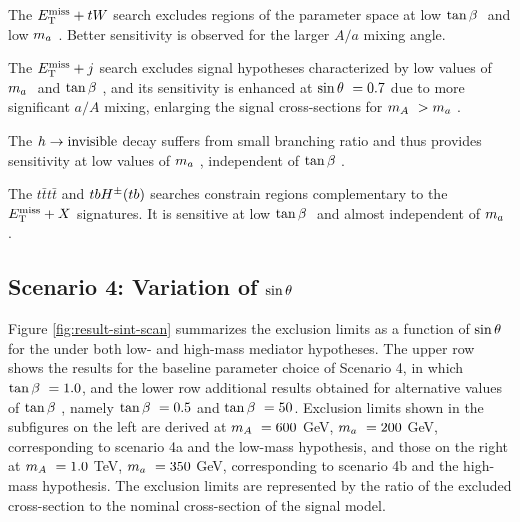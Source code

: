 The $E_{\mathrm{T}}^{\mathrm{miss}}+tW$ search excludes regions of the parameter space at low $\tan\beta~$ and low $m_a~$. Better sensitivity is observed for the larger $A/a$ mixing angle. 

The $E_{\mathrm{T}}^{\mathrm{miss}}+j$ search excludes signal hypotheses characterized by low values of $m_a~$ and $\tan\beta~$, and its sensitivity is enhanced at $\sin\theta~=0.7$ due to more significant $a/A$ mixing, enlarging the signal cross-sections for $m_A~>m_a~$. 

The $h\rightarrow \mathrm{invisible}$ decay suffers from small branching ratio and thus provides sensitivity at low values of $m_a~$, independent of $\tan\beta~$.

The $t\bar{t}t\bar{t}$ and $tbH^{\pm}(tb)$ searches constrain regions complementary to the $E_{\mathrm{T}}^{\mathrm{miss}}+X$ signatures. It is sensitive at low $\tan\beta~$ and almost independent of $m_a~$.

\subsection{Scenario 4: Variation of \texorpdfstring{$\sin\theta~$}{TEXT}}

Figure \ref{fig:result-sint-scan} summarizes the exclusion limits as a function of $\sin\theta~$ for the \thdma under both low- and high-mass mediator hypotheses. The upper row shows the results for the baseline parameter choice of Scenario 4, in which $\tan\beta~=1.0$, and the lower row additional results obtained for alternative values of $\tan\beta~$, namely $\tan\beta~=0.5$ and $\tan\beta~=50$. Exclusion limits shown in the subfigures on the left are derived at $m_A~=600$ GeV, $m_a~=200$ GeV, corresponding to scenario 4a and the low-mass hypothesis, and those on the right at $m_A~=1.0$ TeV, $m_a~=350$ GeV, corresponding to scenario 4b and the high-mass hypothesis. The exclusion limits are represented by the ratio of the excluded cross-section to the nominal cross-section of the signal model.


